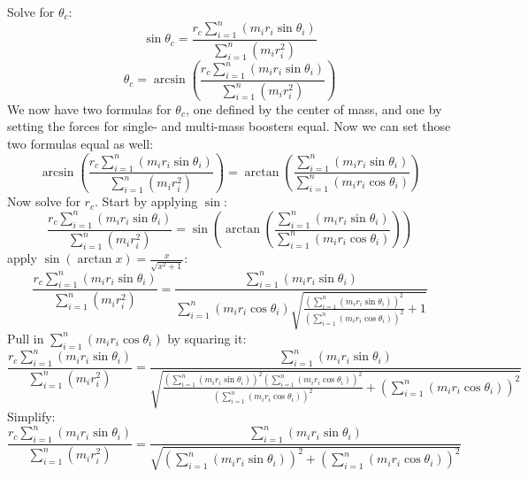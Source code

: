 \documentclass[titlepage]{article}
\numberwithin{equation}{section}
\begin{document}
Solve for $\theta_c$:
\begin{equation}
\sin \theta_c = 
    \frac{
        r_c \sum_{i=1}^{n}(m_i r_i \sin \theta_i)
    } {
        \sum_{i=1}^{n}(m_i r_i^2)
    }
\end{equation}
\begin{equation}
\theta_c = 
\arcsin{\left(
    \frac{
        r_c \sum_{i=1}^{n}(m_i r_i \sin \theta_i)
    } {
        \sum_{i=1}^{n}(m_i r_i^2)
    }
\right)}
\end{equation}
We now have two formulas for $\theta_c$, one defined by the center of mass, and one by setting the forces for single- and multi-mass boosters equal.
Now we can set those two formulas equal as well:
\begin{equation}
\arcsin{\left(
    \frac{
        r_c \sum_{i=1}^{n}(m_i r_i \sin \theta_i)
    } {
        \sum_{i=1}^{n}(m_i r_i^2)
    }
\right)}
= \arctan{\left(\frac{
    \sum_{i=1}^{n}(m_i r_i \sin \theta_i)
} {
    \sum_{i=1}^{n}(m_i r_i \cos \theta_i)
}\right)}
\end{equation}
Now solve for $r_c$. Start by applying $\sin$:
\begin{equation}
\frac{
    r_c \sum_{i=1}^{n}(m_i r_i \sin \theta_i)
} {
    \sum_{i=1}^{n}(m_i r_i^2)
}
= \sin{\left( \arctan{\left( \frac{
    \sum_{i=1}^{n}(m_i r_i \sin \theta_i)
} {
    \sum_{i=1}^{n}(m_i r_i \cos \theta_i)
}\right)} \right)}
\end{equation}
apply $\sin {\left( \arctan x \right)} = \frac{x}{\sqrt{x^2 + 1}}$:
\begin{equation}
\frac{
    r_c \sum_{i=1}^{n}(m_i r_i \sin \theta_i)
} {
    \sum_{i=1}^{n}(m_i r_i^2)
}
= \frac{
    \sum_{i=1}^{n}(m_i r_i \sin \theta_i)
} {
    \sum_{i=1}^{n}(m_i r_i \cos \theta_i)
    \sqrt{\frac{
        \left(\sum_{i=1}^{n}(m_i r_i \sin \theta_i)\right)^2
    } {
        \left(\sum_{i=1}^{n}(m_i r_i \cos \theta_i)\right)^2
    } + 1 }
}
\end{equation}
Pull in $\sum_{i=1}^{n}(m_i r_i \cos \theta_i)$ by squaring it:
\begin{equation}
\frac{
    r_c \sum_{i=1}^{n}(m_i r_i \sin \theta_i)
} {
    \sum_{i=1}^{n}(m_i r_i^2)
}
= \frac{
    \sum_{i=1}^{n}(m_i r_i \sin \theta_i)
} {
    \sqrt{\frac{
        \left(\sum_{i=1}^{n}(m_i r_i \sin \theta_i)\right)^2 \left(\sum_{i=1}^{n}(m_i r_i \cos \theta_i)\right)^2
    } {
        \left(\sum_{i=1}^{n}(m_i r_i \cos \theta_i)\right)^2
    } + \left(\sum_{i=1}^{n}(m_i r_i \cos \theta_i)\right)^2 }
}
\end{equation}
Simplify:
\begin{equation}
\frac{
    r_c \sum_{i=1}^{n}(m_i r_i \sin \theta_i)
} {
    \sum_{i=1}^{n}(m_i r_i^2)
}
= \frac{
    \sum_{i=1}^{n}(m_i r_i \sin \theta_i)
} {
    \sqrt{
        \left(\sum_{i=1}^{n}(m_i r_i \sin \theta_i)\right)^2
      + \left(\sum_{i=1}^{n}(m_i r_i \cos \theta_i)\right)^2
    }
}
\end{equation}
\end{document}
